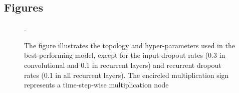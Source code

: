 \documentclass[twocolumn]{bmcart}%
\begin{document}
\begin{backmatter}




\section*{Figures}

\begin{figure}[h!]
  \label{fig:network}
  \caption{
      The figure illustrates the topology and hyper-parameters used in the best-performing model, except for the input dropout rates (0.3 in convolutional and 0.1 in recurrent layers) and recurrent dropout rates (0.1 in all recurrent layers).
   The encircled multiplication sign represents a time-step-wise multiplication node}.
\end{figure}




\end{backmatter}
\end{document}
